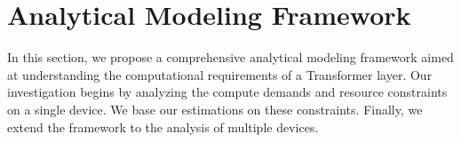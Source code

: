 \section{Analytical Modeling Framework}
\label{sec:modeling}
In this section, we propose a comprehensive analytical modeling framework aimed at understanding the computational requirements of a Transformer layer.
Our investigation begins by analyzing the compute demands and resource constraints on a single device.
We base our estimations on these constraints.
Finally, we extend the framework to the analysis of multiple devices.






